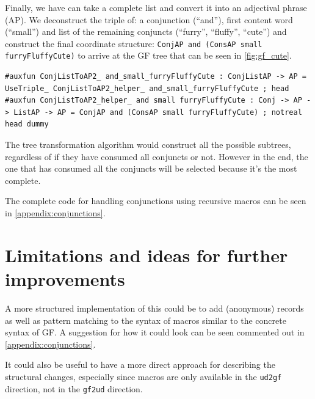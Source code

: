 Finally, we have can take a complete list and convert it into an adjectival phrase (AP). We deconstruct the triple of: a conjunction (``and''), first content word (``small'') and list of the remaining conjuncts (``furry'', ``fluffy'', ``cute'') and construct the final coordinate structure: \verb|ConjAP and (ConsAP small furryFluffyCute)| to arrive at the GF tree that can be seen in \autoref{fig:gf_cute}.
\begin{lstlisting}
#auxfun ConjListToAP2_ and_small_furryFluffyCute : ConjListAP -> AP = UseTriple_ ConjListToAP2_helper_ and_small_furryFluffyCute ; head
#auxfun ConjListToAP2_helper_ and small furryFluffyCute : Conj -> AP -> ListAP -> AP = ConjAP and (ConsAP small furryFluffyCute) ; notreal head dummy
\end{lstlisting}

The tree transformation algorithm would construct all the possible subtrees, regardless of if they have consumed all conjuncts or not. However in the end, the one that has consumed all the conjuncts will be selected because it's the most complete.

The complete code for handling conjunctions using recursive macros can be seen in \autoref{appendix:conjunctions}.

%
%




\section{Limitations and ideas for further improvements}

A more structured implementation of this could be to add (anonymous) records as well as pattern matching to the syntax of macros similar to the concrete syntax of GF. A suggestion for how it could look can be seen commented out in \autoref{appendix:conjunctions}.

It could also be useful to have a more direct approach for describing the structural changes, especially since macros are only available in the \texttt{ud2gf} direction, not in the \texttt{gf2ud} direction.
